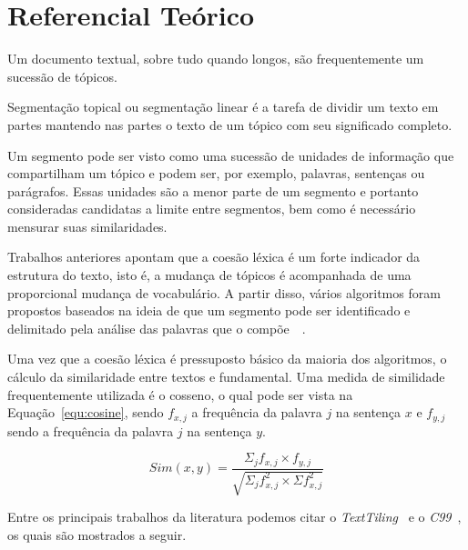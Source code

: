 \section{Referencial Teórico}
	\label{referencial}
	

Um documento textual, sobre tudo quando longos, são frequentemente um sucessão de tópicos. 

Segmentação topical ou segmentação linear é a tarefa de dividir um texto em partes mantendo nas partes o texto de um tópico com seu significado completo.
	
Um segmento pode ser visto como uma sucessão de unidades de informação que compartilham um tópico e podem ser, por exemplo, palavras, sentenças ou parágrafos. Essas unidades são a menor parte de um segmento e portanto consideradas candidatas a limite entre segmentos, bem como é necessário mensurar suas similaridades.

Trabalhos anteriores apontam que a coesão léxica é um forte indicador da estrutura do texto, isto é, a mudança de tópicos é acompanhada de uma proporcional mudança de vocabulário. A partir disso, vários algoritmos foram propostos baseados na ideia de que um segmento pode ser identificado e delimitado pela análise das palavras que o compõe~\cite{Galley2003}~\cite{Boguraev2000}.



Uma vez que a coesão léxica é pressuposto básico da maioria dos algoritmos, o cálculo da similaridade entre textos e fundamental. Uma medida de similidade frequentemente utilizada é o cosseno, o qual pode ser vista na Equação~\ref{equ:cosine}, sendo $f_{x,j}$ a frequência da palavra $j$ na sentença $x$ e $f_{y,j}$ sendo a frequência da palavra $j$ na sentença $y$.


\begin{equation}
Sim(x,y) = \frac
{\Sigma_j f_{x,j} \times f_{y,j}}
{\sqrt{\Sigma_j f^2_{x,j} \times \Sigma f^2_{x,j}}}
\label{equ:cosine}
\end{equation}



Entre os principais trabalhos da literatura podemos citar o  \textit{TextTiling}~\cite{Hearst1994} e o \textit{C99}~\cite{Choi2000}, os quais são mostrados a seguir.

